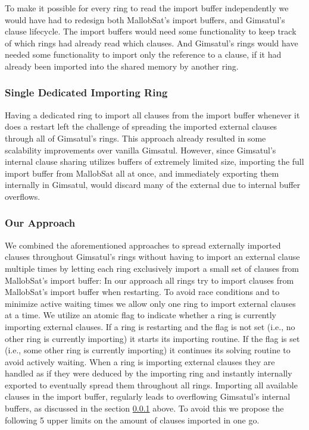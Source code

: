 \documentclass[12pt,a4paper,twoside]{scrartcl}
\numberwithin{equation}{section}
\begin{document}
To make it possible for every ring to read the import buffer independently we would have had to redesign both MallobSat's import buffers, and Gimsatul's clause lifecycle. The import buffers would need some functionality to keep track of which rings had already read which clauses. And Gimsatul's rings would have needed some functionality to import only the reference to a clause, if it had already been imported into the shared memory by another ring. 

\subsubsection{Single Dedicated Importing Ring}
\label{sec:singleDedicatedImportRing}

Having a dedicated ring to import all clauses from the import buffer whenever it does a restart left the challenge of spreading the imported external clauses through all of Gimsatul's rings. This approach already resulted in some scalability improvements over vanilla Gimsatul. However, since Gimsatul's internal clause sharing utilizes buffers of extremely limited size, importing the full import buffer from MallobSat all at once, and immediately exporting them internally in Gimsatul, would discard many of the external due to internal buffer overflows.

\subsubsection{Our Approach}
\label{sec:ourApproach}

We combined the aforementioned approaches to spread externally imported clauses throughout Gimsatul's rings without having to import an external clause multiple times by letting each ring exclusively import a small set of clauses from MallobSat's import buffer: 
In our approach all rings try to import clauses from MallobSat's import buffer when restarting. To avoid race conditions and to minimize active waiting times we allow only one ring to import external clauses at a time. We utilize an atomic flag to indicate whether a ring is currently importing external clauses. If a ring is restarting and the flag is not set (i.e., no other ring is currently importing) it starts its importing routine. If the flag is set (i.e., some other ring is currently importing) it continues its solving routine to avoid actively waiting. 
When a ring is importing external clauses they are handled as if they were deduced by the importing ring and instantly internally exported to eventually spread them throughout all rings. Importing all available clauses in the import buffer, regularly leads to overflowing Gimsatul's internal buffers, as discussed in the section \ref{sec:singleDedicatedImportRing} above. To avoid this we propose the following 5 upper limits on the amount of clauses imported in one go.
\end{document}
